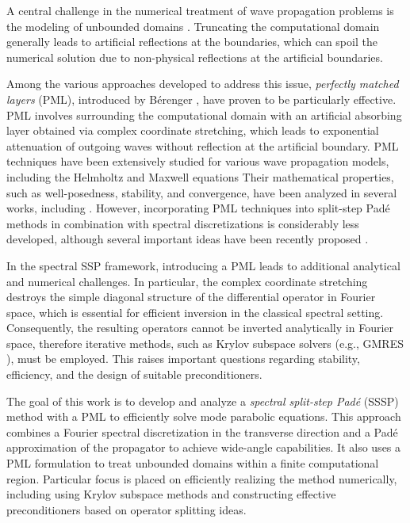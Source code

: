 \documentclass[11pt,a4paper]{article}
\theoremstyle{plain}%
\theoremstyle{definition}
\theoremstyle{remark}
\begin{document}
A central challenge in the numerical treatment of wave propagation problems is the modeling of unbounded domains \cite{givoli2013numerical, hagstrom1999radiation, shen2009some, TSYNKOV1998465}. 
Truncating the computational domain generally leads to artificial reflections at the boundaries, which can spoil the numerical solution %
due to non-physical reflections at the artificial boundaries. 

Among the various approaches developed to address this issue, \textit{perfectly matched layers} (PML), introduced by B\'erenger \cite{berenger1994perfectly}, have proven to be particularly effective. 
%
PML involves surrounding the computational domain with an artificial absorbing layer obtained via complex coordinate stretching, which leads to exponential attenuation of outgoing waves without reflection at the artificial boundary.
%
PML techniques have been extensively studied for various wave propagation models, including the Helmholtz and Maxwell equations
\cite{chew19943d, hesthaven1998analysis, liu1997perfectly}  %
Their mathematical properties, such as well-posedness, stability, and convergence, have been analyzed in several works, including \cite{appelo2006perfectly, becache2000analysis, kim2010}. 
However, incorporating PML techniques into split-step Pad\'e methods in combination with spectral discretizations is considerably less developed, although several important ideas have been recently proposed \cite{antoine2020pseudospectral, antoine2022pseudospectral}.


In the spectral SSP framework, introducing a PML leads to additional analytical and numerical challenges. 
In particular, the complex coordinate stretching destroys the simple diagonal structure of the differential operator in Fourier space, 
which is essential for efficient inversion in the classical spectral setting.
Consequently, the resulting operators cannot be inverted analytically in Fourier space,
therefore iterative methods, such as Krylov subspace solvers (e.g., GMRES \cite{saad1986GMRES, trefethen1997numerical}), must be employed. 
This raises important questions regarding stability, efficiency, and the design of suitable preconditioners.

The goal of this work is to develop and analyze a \textit{spectral split-step Pad\'e} %
(SSSP) method with a PML to efficiently solve mode parabolic equations. 
This approach combines a Fourier spectral discretization in the transverse direction and a Pad\'e approximation of the propagator to achieve wide-angle capabilities. 
It also uses a PML formulation to treat unbounded domains within a finite computational region. 
Particular focus is placed on efficiently realizing the method numerically, including using Krylov subspace methods and constructing effective preconditioners based on operator splitting ideas.
\end{document}
